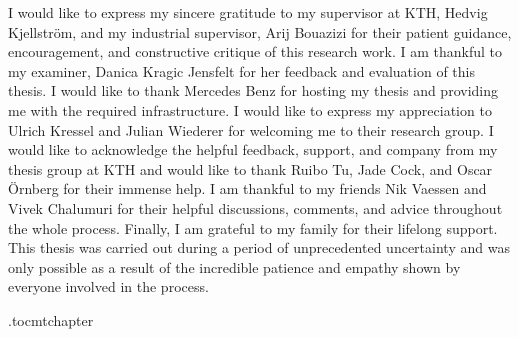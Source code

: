 I would like to express my sincere gratitude to my supervisor at KTH, Hedvig Kjellström, and my industrial supervisor, Arij Bouazizi for their patient guidance, encouragement, and constructive critique of this research work. I am thankful to my examiner, Danica Kragic Jensfelt for her feedback and evaluation of this thesis. I would like to thank Mercedes Benz for hosting my thesis and providing me with the required infrastructure. I would like to express my appreciation to Ulrich Kressel and Julian Wiederer for welcoming me to their research group. I would like to acknowledge the helpful feedback, support, and company from my thesis group at KTH and would like to thank Ruibo Tu, Jade Cock, and Oscar Örnberg for their immense help. I am thankful to my friends Nik Vaessen and Vivek Chalumuri for their helpful discussions, comments, and advice throughout the whole process. Finally, I am grateful to my family for their lifelong support. This thesis was carried out during a period of unprecedented uncertainty and was only possible as a result of the incredible patience and empathy shown by everyone involved in the process.   

\newpage



\newpage

\etocdepthtag.toc{mtchapter}
\thispagestyle{plain}
\tableofcontents

\newpage


